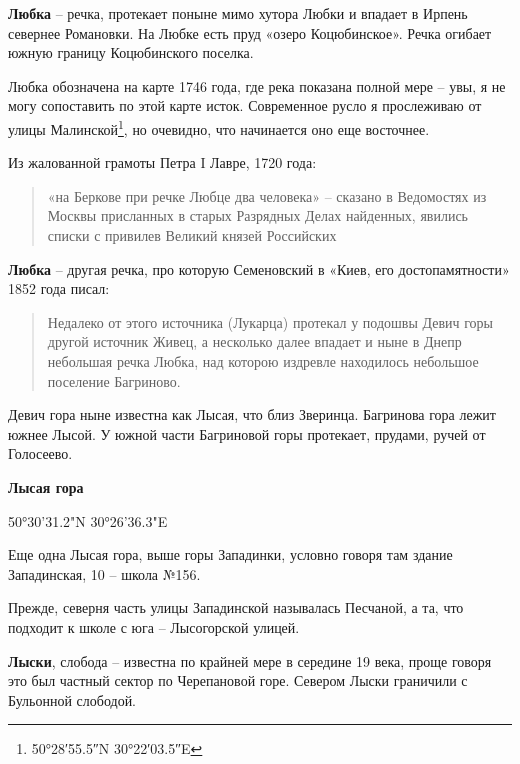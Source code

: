 \medskip



\textbf{Любка} – речка, протекает поныне мимо хутора Любки и впадает в Ирпень севернее Романовки. На Любке есть пруд «озеро Коцюбинское». Речка огибает южную границу Коцюбинского поселка.

Любка обозначена на карте 1746 года, где река показана полной мере – увы, я не могу сопоставить по этой карте исток. Современное русло я прослеживаю от улицы Малинской\footnote{50°28′55.5″N 30°22′03.5″E}, но очевидно, что начинается оно еще восточнее. 

Из жалованной грамоты Петра I Лавре, 1720 года:

\begin{quotation}
«на Беркове при речке Любце два человека» – сказано в Ведомостях из Москвы присланных в старых Разрядных Делах найденных, явились списки с привилев Великий князей Российских
\end{quotation} 

\medskip

\textbf{Любка} – другая речка, про которую Семеновский в «Киев, его достопамятности» 1852 года писал:

\begin{quotation}
Недалеко от этого источника (Лукарца) протекал у подошвы Девич горы другой источник Живец, а несколько далее впадает и ныне в Днепр не\-большая речка Любка, над которою издревле находилось небольшое поселение Багриново.
\end{quotation}

Девич гора ныне известна как Лысая, что близ Зверинца. Багринова гора лежит южнее Лысой. У южной части Багриновой горы протекает, прудами, ручей от Голосеево.\\

\medskip

\textbf{Лысая гора}

50°30'31.2"N 30°26'36.3"E

Еще одна Лысая гора, выше горы Западинки, условно говоря там здание Западинская, 10 – школа  №156.

Прежде, северня часть улицы Западинской называлась Песчаной, а та, что подходит к школе с юга – Лысогорской улицей.\\

\medskip


\textbf{Лыски}, слобода – известна по крайней мере в середине 19 века, проще говоря это был частный сектор по Черепановой горе. Севером Лыски граничили с Бульонной слободой.\\


